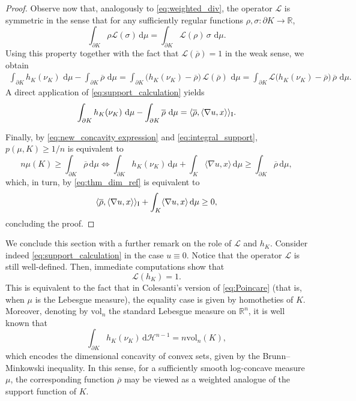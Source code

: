 \documentclass[a4paper, 11pt]{article}
\newcommand{\R}{\mathbb{R}}
\newcommand{\haus}{\mathcal{H}}
\newcommand{\rhobar}{\overline{\rho}}
\theoremstyle{definition}
\newcommand{\vol}{\mathrm{vol}}
\newcommand{\di}{\, \mathrm{d}}
\begin{document}
\begin{proof}
Observe now that, analogously to \eqref{eq:weighted_div}, the operator $\mathcal{L}$ is symmetric in the sense that for any sufficiently regular functions $\rho,\sigma: \partial K \to \R$,
\[
\int_{\partial K} \rho\mathcal{L}(\sigma)\di \mu
=
\int_{\partial K} \mathcal{L}(\rho)\,\sigma\,\di \mu.
\]
Using this property together with the fact that $\mathcal{L}(\overline{\rho})=1$ in the weak sense, we obtain
\begin{align*}
\int_{\partial K}h_{K}(\nu_{K})\,\di\mu
-
\int_{\partial K}\overline{\rho}\,\di \mu
=
\int_{\partial K} \big(h_{K}(\nu_{K})-\overline{\rho}\big)\,\mathcal{L}(\overline{\rho})\,\di \mu 
=
\int_{\partial K} \mathcal{L}\big(h_{K}(\nu_{K})-\overline{\rho}\big)\,\overline{\rho}\,\di \mu.
\end{align*}
A direct application of \eqref{eq:support_calculation} yields
\begin{equation} \label{eq:thm_dim_ref}
    \int_{\partial K}h_{K}(\nu_{K})\,\di\mu- \int_{\partial K} \overline{\rho}\,\di \mu = \langle \overline{\rho}, \langle \nabla u , x \rangle \rangle_{\rm I}.
\end{equation}

Finally, by \eqref{eq:new_concavity expression} and \eqref{eq:integral_support}, $p(\mu,K)\geq 1/n$ is equivalent to
\[n\mu(K) \geq \int_{\partial K}\rhobar \di \mu  \Leftrightarrow \int_{\partial K} h_K(\nu_K) \di \mu +\int_{K} \langle \nabla u,x \rangle \di \mu \geq \int_{\partial K} \rhobar \di \mu,\]
which, in turn, by \eqref{eq:thm_dim_ref} is equivalent to \[\langle \rhobar,\langle \nabla u, x \rangle \rangle_{\rm I}+\int_K \langle \nabla u, x \rangle \di \mu \geq 0,\] concluding the proof.
\end{proof}

We conclude this section with a further remark on the role of $\mathcal{L}$ and $h_K$. Consider indeed \eqref{eq:support_calculation} in the case $u\equiv 0$. Notice that the operator $\mathcal{L}$ is still well-defined. Then, immediate computations show that \[ \mathcal{L}(h_K)=1. \] This is equivalent to the fact that in Colesanti's version of \eqref{eq:Poincare} (that is, when $\mu$ is the Lebesgue measure), the equality case is given by homotheties of $K$. Moreover, denoting by $\vol_n$ the standard Lebesgue measure on $\R^n$, it is well known that \[ \int_{\partial K} h_K(\nu_K)\di \haus^{n-1}=n\vol_n(K),\]
which encodes the dimensional concavity of convex sets, given by the Brunn--Minkowski inequality. In this sense, for a sufficiently smooth log-concave measure $\mu$, the corresponding function $\rhobar$ may be viewed as a weighted analogue of the support function of $K$.
\end{document}
